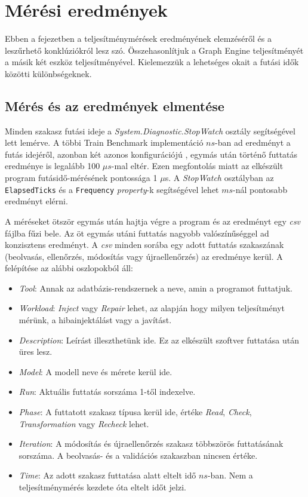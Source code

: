 \chapter{Mérési eredmények}

Ebben a fejezetben a teljesítménymérések eredményének elemzéséről és a leszűrhető konklúziókról lesz szó. Összehasonlítjuk a Graph Engine teljesítményét a másik két eszköz teljesítményével. Kielemezzük a lehetséges okait a futási idők közötti különbségeknek.

\section{Mérés és az eredmények elmentése}

Minden szakasz futási ideje a \emph{System.Diagnostic.StopWatch} osztály segítségével lett lemérve. A többi Train Benchmark implementáció $ns$-ban ad eredményt a futás idejéről, azonban két azonos konfigurációjú , egymás után történő futtatás eredménye is legalább 100 $\mu{}s$-mal eltér. Ezen megfontolás miatt az elkészült program futásidő-mérésének pontossága 1 $\mu{}$s. A \emph{StopWatch} osztályban az \texttt{ElapsedTicks} és a \texttt{Frequency} \emph{property}-k segítségével lehet $ms$-nál pontosabb eredményt elérni.

A méréseket ötször egymás után hajtja végre a program és az eredményt egy \emph{csv} fájlba fűzi bele. Az öt egymás utáni futtatás nagyobb valószínűséggel ad konzisztens eredményt. A \emph{csv} minden sorába egy adott futtatás szakaszának (beolvasás, ellenőrzés, módosítás vagy újraellenőrzés) az eredménye kerül. A felépítése az alábbi oszlopokból áll:

\begin{itemize}
	\item \emph{Tool}: Annak az adatbázis-rendszernek a neve, amin a programot futtatjuk.
	\item \emph{Workload}: \emph{Inject} vagy \emph{Repair} lehet, az alapján hogy milyen teljesítményt mérünk, a hibainjektálást vagy a javítást.
	\item \emph{Description}: Leírást illeszthetünk ide. Ez az elkészült szoftver futtatása után üres lesz.
	\item \emph{Model}: A modell neve és mérete kerül ide.
	\item \emph{Run}: Aktuális futtatás sorszáma 1-től indexelve.
	\item \emph{Phase}: A futtatott szakasz típusa kerül ide, értéke \emph{Read}, \emph{Check}, \emph{Transformation} vagy \emph{Recheck} lehet.
	\item \emph{Iteration}: A módosítás és újraellenőrzés szakasz többszörös futtatásának sorszáma. A beolvasás- és a validációs szakaszban nincsen értéke.
	\item \emph{Time}: Az adott szakasz futtatása alatt eltelt idő $ns$-ban. Nem a teljesítménymérés kezdete óta eltelt időt jelzi.
\end{itemize}

